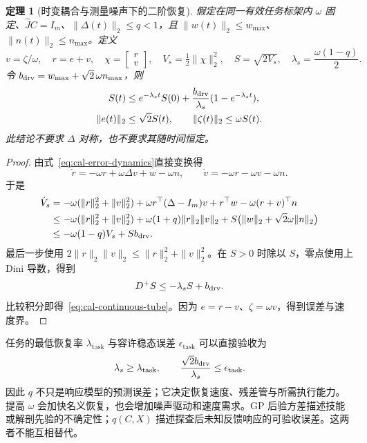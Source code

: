 \documentclass[11pt,a4paper]{article}
\numberwithin{equation}{section}
\newtheorem{theorem}{定理}[section]
\theoremstyle{definition}
\begin{document}
\begin{theorem}[时变耦合与测量噪声下的二阶恢复]
\label{thm:cal-recovery}
假定在同一有效任务标架内 $\omega$ 固定、$\widehat JC=I_m$、$\|\Delta(t)\|_2\le q<1$，且
$\|w(t)\|_2\le w_{\max}$、$\|n(t)\|_2\le n_{\max}$。定义
\begin{equation}
 v=\zeta/\omega,\quad r=e+v,\quad
 \chi=\begin{bmatrix}r\\v\end{bmatrix},\quad
 V_s=\tfrac12\|\chi\|_2^2,\quad S=\sqrt{2V_s},
 \quad \lambda_s=\frac{\omega(1-q)}2.
 \label{eq:cal-servo-energy}
\end{equation}
令 $b_{\rm drv}=w_{\max}+\sqrt2\,\omega n_{\max}$，则
\begin{equation}
 \begin{aligned}
 S(t)&\le e^{-\lambda_st}S(0)
       +\frac{b_{\rm drv}}{\lambda_s}(1-e^{-\lambda_st}),\\
 \|e(t)\|_2&\le\sqrt2S(t),\qquad
 \|\zeta(t)\|_2\le\omega S(t).
 \end{aligned}
 \label{eq:cal-continuous-tube}
\end{equation}
此结论不要求 $\Delta$ 对称，也不要求其随时间恒定。
\end{theorem}

\begin{proof}
由式~\eqref{eq:cal-error-dynamics}直接变换得
\begin{equation}
 \dot r=-\omega r+\omega\Delta v+w-\omega n,
 \qquad
 \dot v=-\omega r-\omega v-\omega n.
 \label{eq:cal-servo-rv}
\end{equation}
于是
\begin{align}
 \dot V_s
 &=-\omega(\|r\|_2^2+\|v\|_2^2)
   +\omega r^\top(\Delta-I_m)v
   +r^\top w-\omega(r+v)^\top n\\
 &\le-\omega(\|r\|_2^2+\|v\|_2^2)
   +\omega(1+q)\|r\|_2\|v\|_2
   +S\bigl(\|w\|_2+\sqrt2\omega\|n\|_2\bigr)\\
 &\le-\omega(1-q)V_s+Sb_{\rm drv}.
 \label{eq:cal-servo-lyapunov}
\end{align}
最后一步使用 $2\|r\|_2\|v\|_2\le\|r\|_2^2+\|v\|_2^2$。在 $S>0$ 时除以 $S$，零点使用上 Dini 导数，得到
\begin{equation}
 D^+S\le-\lambda_sS+b_{\rm drv}.
\end{equation}
比较积分即得~\eqref{eq:cal-continuous-tube}。因为 $e=r-v$、$\zeta=\omega v$，得到误差与速度界。
\end{proof}

任务的最低恢复率 $\lambda_{\mathrm{task}}$ 与容许稳态误差 $\epsilon_{\mathrm{task}}$ 可以直接验收为
\begin{equation}
 \lambda_s\ge\lambda_{\mathrm{task}},\qquad
 \frac{\sqrt2b_{\rm drv}}{\lambda_s}\le\epsilon_{\mathrm{task}}.
 \label{eq:cal-task-rate}
\end{equation}
因此 $q$ 不只是响应模型的预测误差；它决定恢复速度、残差管与所需执行能力。提高 $\omega$ 会加快名义恢复，也会增加噪声驱动和速度需求。GP 后验方差描述技能或解剖先验的不确定性；$q(C,X)$ 描述探查后未知反馈响应的可验收误差。这两者不能互相替代。
\end{document}
